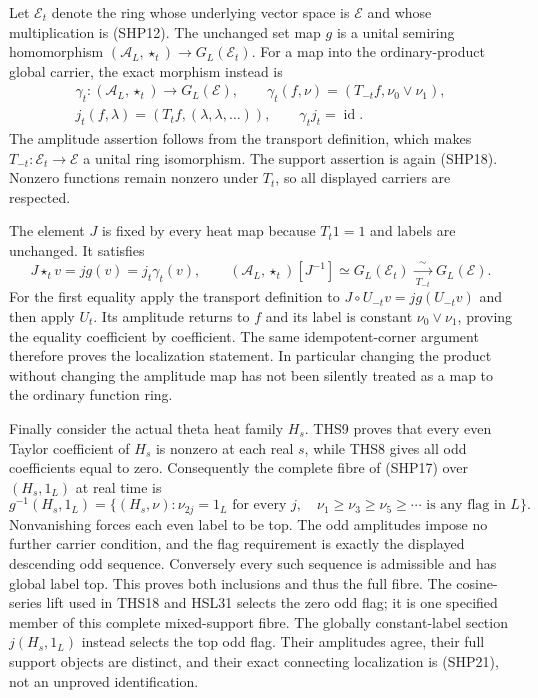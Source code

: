 Let $\mathcal E_t$ denote the ring whose underlying
vector space is $\mathcal E$ and whose multiplication
is (SHP12). The unchanged set map $g$ is a unital
semiring homomorphism
$(\mathcal A_L,\star_t)\to G_L(\mathcal E_t)$.
For a map into the ordinary-product global carrier,
the exact morphism instead is
\begin{equation}\tag{SHP26}
 \begin{gathered}
 \gamma_t:(\mathcal A_L,\star_t)\longrightarrow G_L(\mathcal E),
       \qquad \gamma_t(f,\nu)
              =(T_{-t}f,\nu_0\vee\nu_1),\\
 j_t(f,\lambda)=(T_tf,(\lambda,\lambda,\ldots)),\qquad
 \gamma_tj_t=\operatorname{id}.
 \end{gathered}
\end{equation}
The amplitude assertion follows from the transport
definition, which makes $T_{-t}:\mathcal E_t\to\mathcal E$
a unital ring isomorphism. The support assertion is
again (SHP18). Nonzero functions remain nonzero
under $T_t$, so all displayed carriers are respected.

The element $J$ is fixed by every heat map because
$T_t1=1$ and labels are unchanged. It satisfies
\begin{equation}\tag{SHP27}
 J\star_t v=jg(v)=j_t\gamma_t(v),\qquad
 (\mathcal A_L,\star_t)[J^{-1}]
      \simeq G_L(\mathcal E_t)
      \xrightarrow[\ T_{-t}\ ]{\ \sim\ }G_L(\mathcal E).
\end{equation}
For the first equality apply the transport definition
to $J\circ U_{-t}v=jg(U_{-t}v)$ and then apply $U_t$.
Its amplitude returns to $f$ and its label is constant
$\nu_0\vee\nu_1$, proving the equality coefficient by
coefficient. The same idempotent-corner argument
therefore proves the localization statement.
In particular changing the product without changing
the amplitude map has not been silently treated
as a map to the ordinary function ring.

Finally consider the actual theta heat family $H_s$.
THS9 proves that every even Taylor coefficient of
$H_s$ is nonzero at each real $s$, while THS8 gives
all odd coefficients equal to zero.
Consequently the complete fibre of (SHP17) over
$(H_s,1_L)$ at real time is
\begin{equation}\tag{SHP28}
 g^{-1}(H_s,1_L)=
 \{(H_s,\nu):
     \nu_{2j}=1_L\text{ for every }j,\quad
     \nu_1\ge\nu_3\ge\nu_5\ge\cdots
        \text{ is any flag in }L\}.
\end{equation}
Nonvanishing forces each even label to be top.
The odd amplitudes impose no further carrier condition,
and the flag requirement is exactly the displayed
descending odd sequence. Conversely every such
sequence is admissible and has global label top.
This proves both inclusions and thus the full fibre.
The cosine-series lift used in THS18 and HSL31
selects the zero odd flag; it is one specified member
of this complete mixed-support fibre.
The globally constant-label section $j(H_s,1_L)$
instead selects the top odd flag.
Their amplitudes agree, their full support objects
are distinct, and their exact connecting localization
is (SHP21), not an unproved identification.

